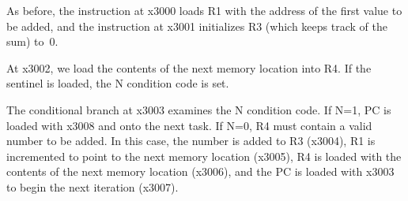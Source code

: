 \documentclass{patt}
\begin{document}
\FloatBarrier

As before, the instruction at x3000 loads R1 with the address of the
first value to be added, and the instruction at x3001 initializes R3
(which keeps track of the sum) to~0.

At x3002, we load the contents of the next memory location into R4.
If the sentinel is loaded, the N condition code is set.

The conditional branch at x3003 examines the N condition code.  If N=1,
PC is loaded with x3008 and onto the next task.  If N=0, R4 must contain 
a valid number to be added.  In this case, the number is added to R3 (x3004), 
R1 is incremented to point to the next memory location (x3005), R4 is loaded 
with the contents of the next memory location (x3006), and the PC is loaded
with x3003 to begin the next iteration (x3007).
\end{document}

